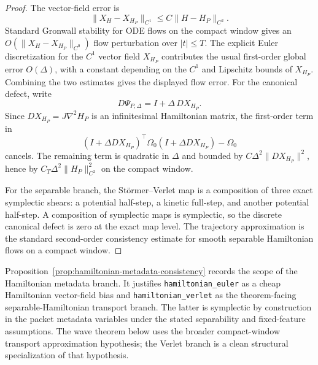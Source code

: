 \begin{proof}
The vector-field error is
\[
\|X_H-X_{H_P}\|_{C^1}
\le
C\|H-H_P\|_{C^2}.
\]
Standard Gronwall stability for ODE flows on the compact window gives an $O(\|X_H-X_{H_P}\|_{C^0})$ flow perturbation over $|t|\le T$.  The explicit Euler discretization for the $C^1$ vector field $X_{H_P}$ contributes the usual first-order global error $O(\Delta)$, with a constant depending on the $C^1$ and Lipschitz bounds of $X_{H_P}$.  Combining the two estimates gives the displayed flow error.  For the canonical defect, write
\[
D\Psi_{P,\Delta}=I+\Delta\,DX_{H_P}.
\]
Since $DX_{H_P}=J\nabla^2H_P$ is an infinitesimal Hamiltonian matrix, the first-order term in
\[
(I+\Delta DX_{H_P})^\top\Omega_0(I+\Delta DX_{H_P})-\Omega_0
\]
cancels.  The remaining term is quadratic in $\Delta$ and bounded by $C\Delta^2\|DX_{H_P}\|^2$, hence by $C_T\Delta^2\|H_P\|_{C^2}^2$ on the compact window.

For the separable branch, the St\"ormer--Verlet map is a composition of three exact symplectic shears: a potential half-step, a kinetic full-step, and another potential half-step. A composition of symplectic maps is symplectic, so the discrete canonical defect is zero at the exact map level. The trajectory approximation is the standard second-order consistency estimate for smooth separable Hamiltonian flows on a compact window.
\end{proof}

Proposition~\ref{prop:hamiltonian-metadata-consistency} records the scope of the Hamiltonian metadata branch.  It justifies \texttt{hamiltonian\_euler} as a cheap Hamiltonian vector-field bias and \texttt{hamiltonian\_verlet} as the theorem-facing separable-Hamiltonian transport branch.  The latter is symplectic by construction in the packet metadata variables under the stated separability and fixed-feature assumptions.  The wave theorem below uses the broader compact-window transport approximation hypothesis; the Verlet branch is a clean structural specialization of that hypothesis.

